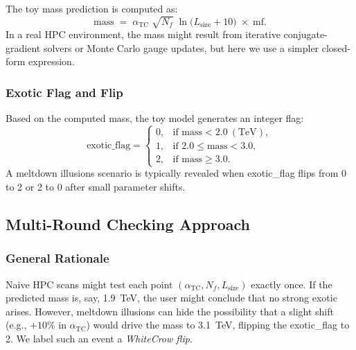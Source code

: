 \documentclass[11pt]{article}
\begin{document}
The toy mass prediction is computed as:
\[
\mathrm{mass} \;=\; \alpha_{\mathrm{TC}}\; \sqrt{N_f} \;\ln\bigl(L_{\mathrm{size}} + 10\bigr)\; \times \;\mathrm{mf}.
\]
In a real HPC environment, the mass might result from
iterative conjugate-gradient solvers or Monte Carlo gauge updates,
but here we use a simpler closed-form expression.

\subsubsection{Exotic Flag and Flip}

Based on the computed mass, the toy model generates an integer flag:
\[
\mathrm{exotic\_flag} = 
\begin{cases}
0, & \text{if } \mathrm{mass} < 2.0\ (\mathrm{TeV}),\\
1, & \text{if } 2.0 \le \mathrm{mass} < 3.0,\\
2, & \text{if } \mathrm{mass} \ge 3.0.
\end{cases}
\]
A meltdown illusions scenario is typically revealed when
exotic\_flag flips from 0 to 2 or 2 to 0 after small parameter shifts.

\subsection{Multi-Round Checking Approach}

\subsubsection{General Rationale}

Naive HPC scans might test each point $(\alpha_{\mathrm{TC}}, N_f, L_{\mathrm{size}})$
exactly once. If the predicted mass is, say, 1.9~TeV, the user might
conclude that no strong exotic arises. However, meltdown illusions
can hide the possibility that a slight shift (e.g., $+10\%$ in $\alpha_{\mathrm{TC}}$)
would drive the mass to 3.1~TeV, flipping the exotic\_flag to 2.
We label such an event a \textit{WhiteCrow flip}.
\end{document}
